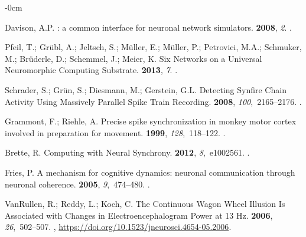 \documentclass[brainsci, %
               review,submit,pdftex,moreauthors
               ]{Definitions/mdpi}
\begin{document}
\begin{adjustwidth}{-\extralength}{0cm}
\begin{thebibliography}{999}
  Davison, A.P.
  : a common interface for neuronal network simulators.
   {\bf 2008}, {\em 2}.
  .
  
  Pfeil, T.; Grübl, A.; Jeltsch, S.; Müller, E.; Müller, P.; Petrovici, M.A.;
    Schmuker, M.; Brüderle, D.; Schemmel, J.; Meier, K.
  \newblock Six {Networks} on a {Universal} {Neuromorphic} {Computing}
    {Substrate}.
   {\bf 2013}, {\em 7}.
  .
  
  Schrader, S.; Grün, S.; Diesmann, M.; Gerstein, G.L.
  \newblock Detecting {Synfire} {Chain} {Activity} {Using} {Massively} {Parallel}
    {Spike} {Train} {Recording}.
   {\bf 2008}, {\em 100},~2165--2176.
  .
  
  Grammont, F.; Riehle, A.
  \newblock Precise spike synchronization in monkey motor cortex involved in
    preparation for movement.
   {\bf 1999}, {\em 128},~118--122.
  .
  
  Brette, R.
  \newblock Computing with {Neural} {Synchrony}.
   {\bf 2012}, {\em 8},~e1002561.
  .
  
  Fries, P.
  \newblock A mechanism for cognitive dynamics: neuronal communication through
    neuronal coherence.
   {\bf 2005}, {\em 9},~474--480.
  .
  
  VanRullen, R.; Reddy, L.; Koch, C.
  \newblock The {Continuous} {Wagon} {Wheel} {Illusion} {Is} {Associated} with
    {Changes} in {Electroencephalogram} {Power} at 13 {Hz}.
   {\bf 2006}, {\em 26},~502--507.
  , {\url{https://doi.org/10.1523/jneurosci.4654-05.2006}}.
  

\end{thebibliography}
\end{adjustwidth}
\end{document}
